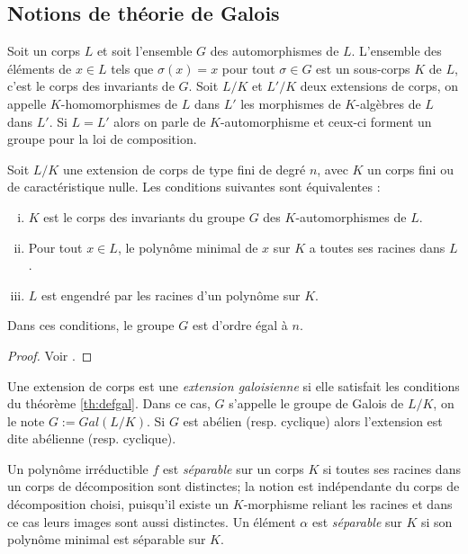 \documentclass[a4paper]{article} %
\numberwithin{section}{part}
\numberwithin{equation}{section}
\begin{document}
\subsection{Notions de théorie de Galois}
Soit un corps $L$ et soit l'ensemble $G$ des automorphismes de $L$. L'ensemble 
des éléments de $x\in L$ tels que $\sigma(x) = x$ pour tout $\sigma\in G$ est un
sous-corps $K$ de $L$, c'est le corps des invariants de $G$. Soit $L/K$ et
$L'/K$ deux extensions de corps, on appelle $K$-homomorphismes de $L$ dans $L'$ 
les morphismes de $K$-algèbres de $L$ dans $L'$. Si $L = L'$ alors on parle de
$K$-automorphisme et ceux-ci forment un groupe pour la loi de composition.

\begin{thm}
\label{th:defgal}
Soit $L/K$ une extension de corps de type fini de degré $n$, avec $K$ un corps
fini ou de caractéristique nulle. Les conditions suivantes sont équivalentes :
\begin{enumerate}[(i)]
	\item $K$ est le corps des invariants du groupe $G$ des $K$-automorphismes
de $L$.
	\item Pour tout $x\in L$, le polynôme minimal de $x$ sur $K$ a toutes ses
racines dans $L$.
	\item $L$ est engendré par les racines d'un polynôme sur $K$.
\end{enumerate}
Dans ces conditions, le groupe $G$ est d'ordre égal à $n$.
\end{thm}
\begin{proof}
Voir \cite[p. 101, th. 1]{Sam}.
\end{proof}

\begin{defn}
\label{def:gal}
Une extension de corps est une \emph{extension galoisienne} si elle satisfait 
les conditions du théorème \ref{th:defgal}. Dans ce cas, $G$ s'appelle le groupe
de Galois de $L/K$, on le note $G := Gal(L/K)$. Si $G$ est abélien (resp. 
cyclique) alors l'extension est dite abélienne (resp. cyclique).
\end{defn}

Un polynôme irréductible $f$ est \emph{séparable} sur un corps $K$ si toutes
ses racines dans un corps de décomposition sont distinctes; la notion est
indépendante du corps de décomposition choisi, puisqu'il existe un $K$-morphisme
reliant les racines et dans ce cas leurs images sont aussi distinctes. 
Un élément $\alpha$ est \emph{séparable} sur $K$ si son polynôme minimal est 
séparable sur $K$.
\end{document}
